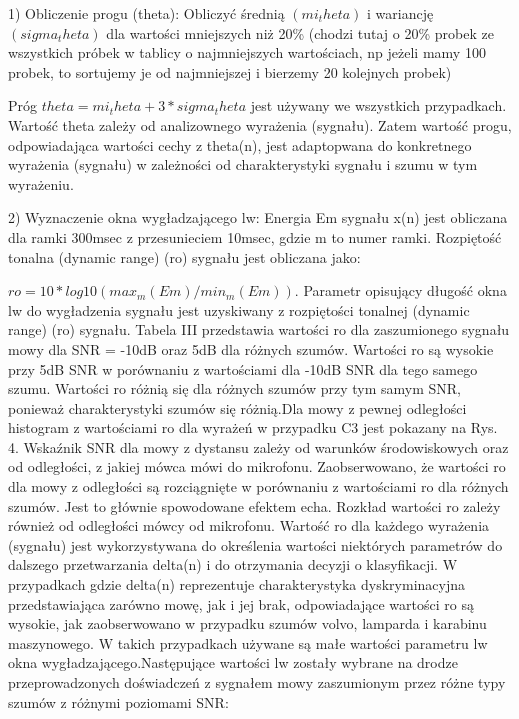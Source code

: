 \documentclass[eng,printmode]{mgr}
\begin{document}
  1) Obliczenie progu (theta):
  Obliczyć średnią $(mi_theta)$ i wariancję $(sigma_theta)$ dla wartości  mniejszych niż 20\% (chodzi tutaj o 20\% probek ze wszystkich próbek w tablicy o najmniejszych wartościach, np jeżeli mamy 100 probek, to sortujemy je od najmniejszej i bierzemy 20 kolejnych probek)
  
  Próg $theta = mi_theta + 3*sigma_theta$ jest używany we wszystkich przypadkach. Wartość theta zależy od analizownego wyrażenia (sygnału). Zatem wartość progu, odpowiadająca wartości cechy z theta(n), jest adaptopwana do konkretnego wyrażenia (sygnału) w zależności od charakterystyki sygnału i szumu w tym wyrażeniu.
  
  2) Wyznaczenie okna wygładzającego lw:
  Energia Em sygnału x(n) jest obliczana dla ramki 300msec z przesunieciem 10msec, gdzie m to numer ramki. Rozpiętość tonalna (dynamic range) (ro) sygnału jest obliczana jako:
  
  $ro = 10*log10(max_m(Em)/min_m(Em)).$
  Parametr opisujący długość okna lw do wygładzenia sygnału jest uzyskiwany z rozpiętości tonalnej (dynamic range) (ro) sygnału. Tabela III przedstawia wartości ro dla zaszumionego sygnału mowy dla SNR = -10dB oraz 5dB dla różnych szumów. Wartości ro są wysokie przy 5dB SNR w porównaniu z wartościami dla -10dB SNR dla tego samego szumu. Wartości ro różnią się dla różnych szumów przy tym samym SNR, ponieważ charakterystyki szumów się różnią.Dla mowy z pewnej odległości histogram z wartościami ro dla wyrażeń w przypadku C3 jest pokazany na Rys. 4. Wskaźnik SNR dla mowy z dystansu zależy od warunków środowiskowych oraz od odległości, z jakiej mówca mówi do mikrofonu.  Zaobserwowano, że wartości ro dla mowy z odległości są rozciągnięte w porównaniu z wartościami ro dla różnych szumów. Jest to głównie spowodowane efektem echa. Rozkład wartości ro zależy również od odległości mówcy od mikrofonu. Wartość ro dla każdego wyrażenia (sygnału) jest wykorzystywana do określenia wartości niektórych parametrów do dalszego przetwarzania delta(n) i do otrzymania decyzji o klasyfikacji. W przypadkach gdzie delta(n) reprezentuje charakterystyka dyskryminacyjna przedstawiająca zarówno mowę, jak i jej brak, odpowiadające wartości ro są wysokie, jak zaobserwowano w przypadku szumów volvo, lamparda i karabinu maszynowego. W takich przypadkach używane są małe wartości parametru lw okna wygładzającego.Następujące wartości lw zostały wybrane na drodze przeprowadzonych doświadczeń z sygnałem mowy zaszumionym przez różne typy szumów z różnymi poziomami SNR:
  
\end{document}
